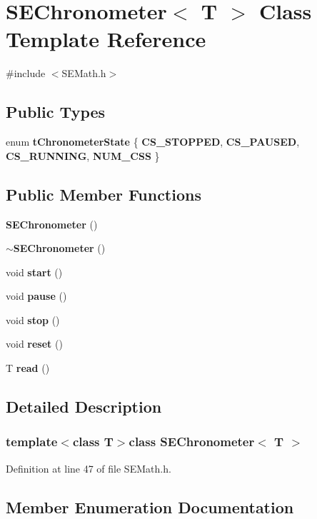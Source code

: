 \section{S\+E\+Chronometer$<$ T $>$ Class Template Reference}
\label{class_s_e_chronometer}


{\ttfamily \#include $<$S\+E\+Math.\+h$>$}

\subsection*{Public Types}
\begin{DoxyCompactItemize}
\item 
enum {\bf t\+Chronometer\+State} \{ {\bf C\+S\+\_\+\+S\+T\+O\+P\+P\+E\+D}, 
{\bf C\+S\+\_\+\+P\+A\+U\+S\+E\+D}, 
{\bf C\+S\+\_\+\+R\+U\+N\+N\+I\+N\+G}, 
{\bf N\+U\+M\+\_\+\+C\+S\+S}
 \}
\end{DoxyCompactItemize}
\subsection*{Public Member Functions}
\begin{DoxyCompactItemize}
\item 
{\bf S\+E\+Chronometer} ()
\item 
{\bf $\sim$\+S\+E\+Chronometer} ()
\item 
void {\bf start} ()
\item 
void {\bf pause} ()
\item 
void {\bf stop} ()
\item 
void {\bf reset} ()
\item 
T {\bf read} ()
\end{DoxyCompactItemize}


\subsection{Detailed Description}
\subsubsection*{template$<$class T$>$class S\+E\+Chronometer$<$ T $>$}



Definition at line 47 of file S\+E\+Math.\+h.



\subsection{Member Enumeration Documentation}
